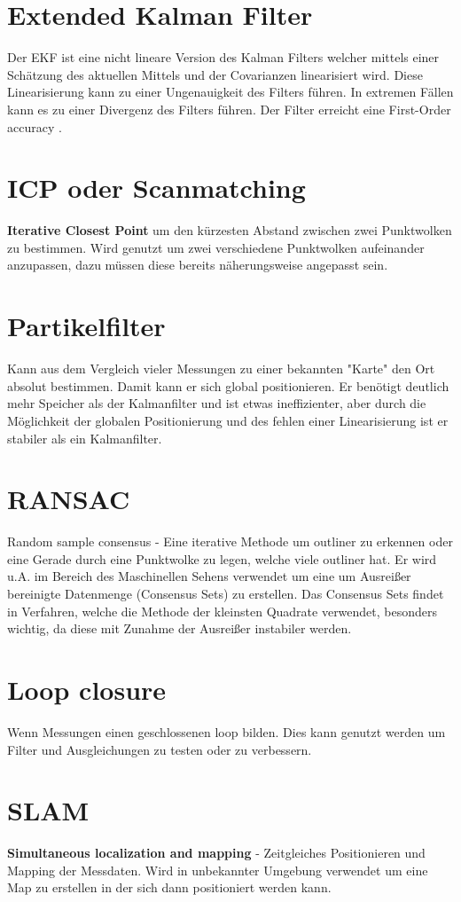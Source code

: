 \section{Extended Kalman Filter}
\label{chp:stoffübersicht:sec:ExtendedKalmanFilter}
Der EKF ist eine nicht lineare Version des Kalman Filters welcher mittels einer Schätzung des 
aktuellen Mittels und der Covarianzen linearisiert wird. Diese Linearisierung kann zu einer Ungenauigkeit des Filters führen. In extremen Fällen kann es zu einer Divergenz des Filters führen. Der Filter erreicht eine First-Order accuracy \cite{order-accuracy}.

\section{ICP oder Scanmatching}
\label{chp:stoffübersicht:sec:ICPoderScanmatching}
\textbf{Iterative Closest Point} um den kürzesten Abstand zwischen zwei Punktwolken zu bestimmen. Wird genutzt um zwei verschiedene Punktwolken aufeinander anzupassen, dazu müssen diese bereits näherungsweise angepasst sein.

\section{Partikelfilter}
\label{chp:stoffübersicht:sec:Partikelfilter}
Kann aus dem Vergleich vieler Messungen zu einer bekannten "Karte" den Ort absolut bestimmen. Damit kann er sich global positionieren. Er benötigt deutlich mehr Speicher als der Kalmanfilter und ist etwas ineffizienter, aber durch die Möglichkeit der globalen Positionierung und des fehlen einer Linearisierung ist er stabiler als ein Kalmanfilter.

\section{RANSAC}
\label{chp:stoffübersicht:sec:RANSAC}
Random sample consensus - Eine iterative Methode um outliner zu erkennen oder eine Gerade durch eine Punktwolke zu legen, welche viele outliner hat. Er wird u.A. im Bereich des Maschinellen Sehens verwendet um eine um Ausreißer bereinigte Datenmenge (Consensus Sets) zu erstellen. Das Consensus Sets findet in Verfahren, welche die Methode der kleinsten Quadrate verwendet, besonders wichtig, da diese mit Zunahme der Ausreißer instabiler werden.

\section{Loop closure}
\label{chp:stoffübersicht:sec:LoopClosure}
Wenn Messungen einen geschlossenen loop bilden. Dies kann genutzt werden um Filter und Ausgleichungen zu testen oder zu verbessern.

\section{SLAM}
\label{chp:stoffübersicht:sec:SLAM}
\textbf{Simultaneous localization and mapping} - Zeitgleiches Positionieren und Mapping der Messdaten. Wird in unbekannter Umgebung verwendet um eine Map zu erstellen in der sich dann positioniert werden kann.

